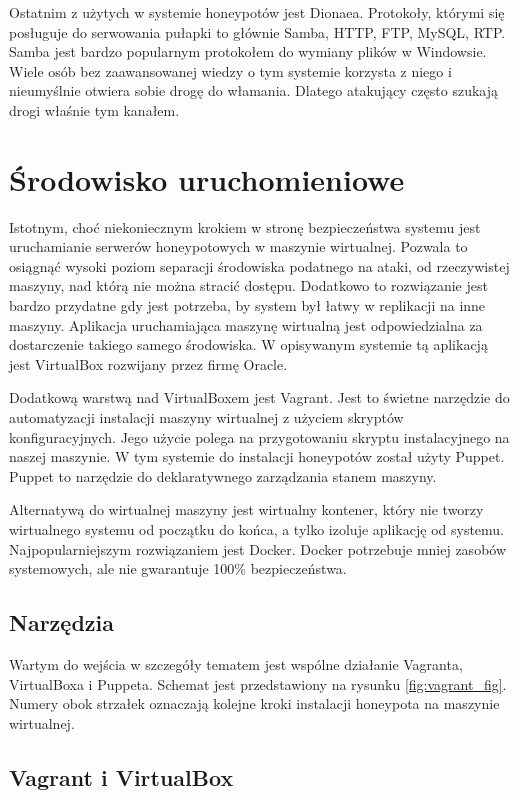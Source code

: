 \documentclass[runningheads,a4paper]{llncs}
\begin{document}
Ostatnim z użytych w systemie honeypotów jest Dionaea. Protokoły, którymi się posługuje do serwowania pułapki to głównie Samba, HTTP, FTP, MySQL, RTP. Samba jest bardzo popularnym protokołem do wymiany plików w Windowsie. Wiele osób bez zaawansowanej wiedzy o tym systemie korzysta z niego i nieumyślnie otwiera sobie drogę do włamania. Dlatego atakujący często szukają drogi właśnie tym kanałem.

\section{Środowisko uruchomieniowe}

Istotnym, choć niekoniecznym krokiem w stronę bezpieczeństwa systemu jest uruchamianie serwerów honeypotowych w maszynie wirtualnej. Pozwala to osiągnąć wysoki poziom separacji środowiska podatnego na ataki, od rzeczywistej maszyny, nad którą nie można stracić dostępu. Dodatkowo to rozwiązanie jest bardzo przydatne gdy jest potrzeba, by system był łatwy w replikacji na inne maszyny. Aplikacja uruchamiająca maszynę wirtualną jest odpowiedzialna za dostarczenie takiego samego środowiska. W opisywanym systemie tą aplikacją jest VirtualBox rozwijany przez firmę Oracle.

Dodatkową warstwą nad VirtualBoxem jest Vagrant. Jest to świetne narzędzie do automatyzacji instalacji maszyny wirtualnej z użyciem skryptów konfiguracyjnych. Jego użycie polega na przygotowaniu skryptu instalacyjnego na naszej maszynie. W tym systemie do instalacji honeypotów został użyty Puppet. Puppet to narzędzie do deklaratywnego zarządzania stanem maszyny.

Alternatywą do wirtualnej maszyny jest wirtualny kontener, który nie tworzy wirtualnego systemu od początku do końca, a tylko izoluje aplikację od systemu. Najpopularniejszym rozwiązaniem jest Docker. Docker potrzebuje mniej zasobów systemowych, ale nie gwarantuje 100\% bezpieczeństwa.

\subsection{Narzędzia}

Wartym do wejścia w szczegóły tematem jest wspólne działanie Vagranta, VirtualBoxa i Puppeta. Schemat jest przedstawiony na rysunku \ref{fig:vagrant_fig}. Numery obok strzałek oznaczają kolejne kroki instalacji honeypota na maszynie wirtualnej.

\subsection*{Vagrant i VirtualBox}
\end{document}
